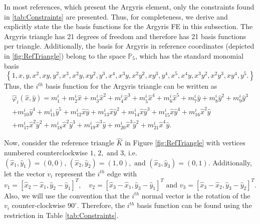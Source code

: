 

In most references, which present the Argyris element, only the constraints
found in \autoref{tab:Constraints} are presented. Thus, for completeness, we
derive and explicitly state the the basis functions for the Argyris FE in this
subsection. The Argyris triangle has 21 degrees of freedom and therefore has 21
basis functions per triangle.  Additionally, the basis for Argyris in reference
coordinates (depicted in \autoref{fig:RefTriangle}) belong to the space
$\mathbb{P}_5$, which has the standard monomial basis
\begin{equation*}
	\left\{
    1, x, y, x^2, xy, y^2, x^3, x^2y, xy^2, y^3, x^4, x^3y,
    x^2y^2, xy^3, y^4, x^5, x^4y, x^3y^2, x^2y^3, xy^4, y^5.
  \right\}
\end{equation*}
Thus, the $i^{th}$ basis function for the Argyris triangle can be written as
\begin{equation}
	\begin{split}
	\hat{\varphi}_i(\hat{x},\hat{y}) = m^i_1 + m^i_2 \hat{x} + m^i_3 \hat{x}^2 + m^i_4 \hat{x}^3 + m^i_5 \hat{x}^4 + m^i_6 \hat{x}^5 + m^i_7 \hat{y} + m^i_8
 	\hat{y}^2 + m^i_9 \hat{y}^3 \\
 + m^i_{10} \hat{y}^4 + m^i_{11} \hat{y}^5 + m^i_{12}  \hat{x} \hat{y} + m^i_{13} \hat{x} \hat{y}^2 + m^i_{14} \hat{x} \hat{y}^3 + m^i_{15}
 	\hat{x} \hat{y}^4 + m^i_{16} \hat{x}^2 \hat{y} \\
 + m^i_{17} \hat{x}^2 \hat{y}^2 + m^i_{18}\hat{x}^2 \hat{y}^3 + m^i_{19} \hat{x}^3 \hat{y} + m^i_{20}\hat{x}^3 \hat{y}^2 + m^i_{21} \hat{x}^4 \hat{y}.
 \end{split}
	\label{eqn:Basis}
\end{equation}

Now, consider the reference triangle $\hat{K}$ in Figure \ref{fig:RefTriangle} with
vertices numbered counterclockwise $1,\, 2,\text{ and } 3$, i.e.
$(\hat{x}_1,\hat{y}_1)=(0,0),\, (\hat{x}_2,\hat{y}_2)=(1,0),\text{ and } (\hat{x}_3,\hat{y}_3)=(0,1)$.
Additionally, let the vector $v_i$ represent the $i^{th}$ edge with
\begin{equation*}
  v_1 = [\hat{x}_2-\hat{x}_1,\hat{y}_2-\hat{y}_1]^T, \quad v_2=[\hat{x}_3-\hat{x}_1,\hat{y}_3-\hat{y}_1]^T \text{ and } v_3=[\hat{x}_3
  -\hat{x}_2,\hat{y}_3-\hat{y}_2]^T.
\end{equation*}
Also, we will use the convention that the $i^{th}$ normal vector is the rotation
of the $v_i$ counter-clockwise $90^\circ$. Therefore, the $i^{th}$ basis
function can be found using the restriction in Table \ref{tab:Constraints}.


